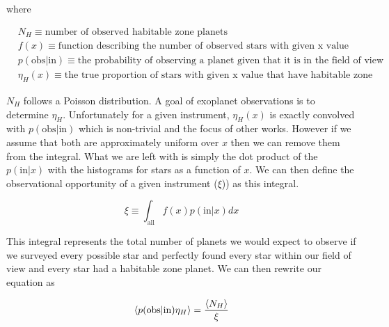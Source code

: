 \documentclass{article}
\begin{document}
	where 
	
	\begin{align*}
	&N_H \equiv \mbox{number of observed habitable zone planets} \\
	&f(x) \equiv \mbox{function describing the number of observed stars with given x value} \\
	&p(\mbox{obs}|\mbox{in}) \equiv \mbox{the probability of observing a planet given that it is in the field of view} \\
	&\eta_H(x) \equiv \mbox{the true proportion of stars with given x value that have habitable zone planets}
	\end{align*}
	
	$N_H$ follows a Poisson distribution. A goal of exoplanet observations is to determine $\eta_H$. Unfortunately for a given instrument, $\eta_H(x)$ is exactly convolved with $p(\mbox{obs}|\mbox{in})$ which is non-trivial and the focus of other works. However if we assume that both are approximately uniform over $x$ then we can remove them from the integral. What we are left with is simply the dot product of the $p(\mbox{in}|x)$ with the histograms for stars as a function of $x$. We can then define the observational opportunity of a given instrument ($\xi$)) as this integral. 
	
	\begin{equation}
	\xi \equiv \int_{\mbox{all}} f(x) p(\mbox{in}|x) dx
	\end{equation}
	
	This integral represents the total number of planets we would expect to observe if we surveyed every possible star and perfectly found every star within our field of view and every star had a habitable zone planet. We can then rewrite our equation as 

	\begin{equation}
	\braket{p(\mbox{obs}|\mbox{in}) \eta_H} = \frac{\braket{N_H}}{\xi}
	\end{equation}
	
\end{document}
